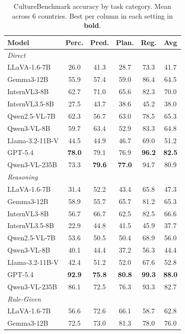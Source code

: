 \begin{table}[t]
\centering
\small
\caption{CultureBenchmark accuracy by task category. Mean across 6 countries. Best per column in each setting in \textbf{bold}.}
\label{tab:results_by_category}
\begin{tabular}{lccccc}
\toprule
Model & Perc. & Pred. & Plan. & Reg. & Avg \\
\midrule
\multicolumn{6}{l}{\textit{Direct}} \\
LLaVA-1.6-7B & 26.0 & 41.3 & 28.7 & 73.3 & 41.7 \\
Gemma3-12B & 55.9 & 57.4 & 59.0 & 86.4 & 64.5 \\
InternVL3-8B & 62.7 & 71.0 & 65.6 & 82.3 & 70.0 \\
InternVL3.5-8B & 27.5 & 43.7 & 38.6 & 45.2 & 38.0 \\
Qwen2.5-VL-7B & 62.3 & 56.7 & 63.0 & 78.5 & 65.3 \\
Qwen3-VL-8B & 59.7 & 63.4 & 52.9 & 83.3 & 64.8 \\
Llama-3.2-11B-V & 44.5 & 44.9 & 46.7 & 69.0 & 51.2 \\
GPT-5.4 & \textbf{78.0} & 79.1 & 76.9 & \textbf{96.2} & \textbf{82.5} \\
Qwen3-VL-235B & 73.3 & \textbf{79.6} & \textbf{77.0} & 94.7 & 80.9 \\
\midrule
\multicolumn{6}{l}{\textit{Reasoning}} \\
LLaVA-1.6-7B & 31.4 & 52.2 & 43.4 & 65.8 & 47.3 \\
Gemma3-12B & 58.9 & 55.7 & 65.7 & 81.2 & 65.3 \\
InternVL3-8B & 56.7 & 66.7 & 62.5 & 82.5 & 66.6 \\
InternVL3.5-8B & 22.9 & 44.8 & 41.5 & 45.9 & 37.7 \\
Qwen2.5-VL-7B & 53.6 & 50.5 & 50.4 & 68.9 & 56.0 \\
Qwen3-VL-8B & 40.1 & 44.4 & 37.2 & 56.3 & 44.4 \\
Llama-3.2-11B-V & 42.4 & 51.2 & 52.0 & 67.6 & 52.8 \\
GPT-5.4 & \textbf{92.9} & \textbf{75.8} & \textbf{80.8} & \textbf{99.3} & \textbf{88.0} \\
Qwen3-VL-235B & 86.1 & 72.5 & 76.3 & 93.3 & 82.7 \\
\midrule
\multicolumn{6}{l}{\textit{Rule-Given}} \\
LLaVA-1.6-7B & 56.6 & 72.6 & 66.1 & 58.7 & 62.8 \\
Gemma3-12B & 72.5 & 73.0 & 81.3 & 78.0 & 76.0 \\

\end{tabular}
\end{table}
